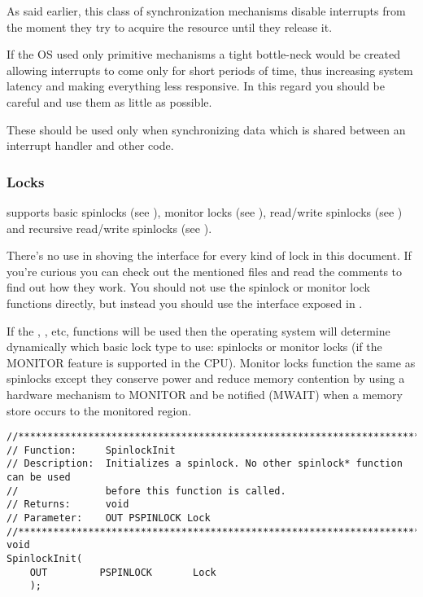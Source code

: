 \begin{appendices}
As said earlier, this class of synchronization mechanisms disable interrupts from the moment they
try to acquire the resource until they release it.

If the OS used only primitive mechanisms a tight bottle-neck would be created allowing interrupts to
come only for short periods of time, thus increasing system latency and making everything less
responsive. In this regard you should be careful and use them as little as possible.

These should be used only when synchronizing data which is shared between an interrupt handler and
other code.

\subsubsection{Locks}

\projectname supports basic spinlocks (see ), monitor locks (see ),
read/write spinlocks (see ) and recursive read/write spinlocks
(see ).

There's no use in shoving the interface for every kind of lock in this document. If you're curious 
you can check out the mentioned files and read the comments to find out how they work. You should
 not use the spinlock or monitor lock functions directly, but instead you should use the interface
 exposed in .

If the , , etc, functions will be used then the operating system
will determine dynamically which basic lock type to use: spinlocks or monitor locks (if the MONITOR
feature is supported in the CPU). Monitor locks function the same as spinlocks except they conserve
power and reduce memory contention by using a hardware mechanism to MONITOR and be notified (MWAIT)
when a memory store occurs to the monitored region.

\begin{lstlisting}[caption={Spinlock Interface},label={lst:Spinlock}]
//******************************************************************************
// Function:     SpinlockInit
// Description:  Initializes a spinlock. No other spinlock* function can be used
//               before this function is called.
// Returns:      void
// Parameter:    OUT PSPINLOCK Lock
//******************************************************************************
void
SpinlockInit(
    OUT         PSPINLOCK       Lock
    );


\end{lstlisting}
\end{appendices}
